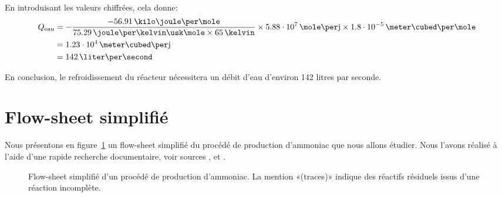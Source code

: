 En introduisant les valeurs chiffrées, cela donne:
\begin{align*}
    Q\ind{eau} &=
    -\frac{-56.91\,\kilo\joule\per\mole}{75.29\,\joule\per\kelvin\usk\mole
    \times 65\,\kelvin} \times 5.88\cdot10^7\,\mole\per\mbox{j}
    \times 1.8\cdot10^{-5}\,\meter\cubed\per\mole \\
    &= 1.23\cdot10^4\,\meter\cubed\per\mbox{j} \\
    &= 142\,\liter\per\second \\
\end{align*}

En conclusion, le refroidissement du réacteur nécessitera un débit d'eau
d'environ 142 litres par seconde.

\section{Flow-sheet simplifié}

Nous présentons en figure~\ref{fig:flow-sheet} un flow-sheet simplifié
du procédé de production d'ammoniac que nous allons étudier.
Nous l'avons réalisé à l'aide d'une rapide recherche documentaire,
voir sources \cite{process-patent}, \cite{epa} et \cite{contaminants}.

\begin{figure}
    
    \caption{Flow-sheet simplifié d'un procédé de production d'ammoniac.
        La mention «(traces)» indique des
        réactifs résiduels issus d'une réaction incomplète.
    }
    \label{fig:flow-sheet}
\end{figure}
